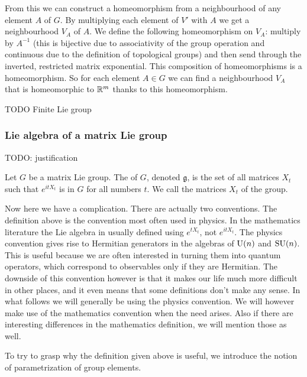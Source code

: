 From this we can construct a homeomorphism from a neighbourhood of any element $A$ of $G$. By multiplying each element of $V'$ with $A$ we get a neighbourhood $V_A$ of $A$. We define the following homeomorphism on $V_A$: multiply by $A^{-1}$ (this is bijective due to associativity of the group operation and continuous due to the definition of topological groups) and then send through the inverted, restricted matrix exponential. This composition of homeomorphisms is a homeomorphism. So for each element $A \in G$ we can find a neighbourhood $V_A$ that is homeomorphic to $\mathbb{R}^m$ thanks to this homeomorphism.

\begin{example}
TODO Finite Lie group
\end{example}


\subsubsection{Lie algebra of a matrix Lie group}
TODO: justification

\begin{definition}
Let $G$ be a matrix Lie group. The  of $G$, denoted $\mathfrak{g}$, is the set of all matrices $X_t$ such that $e^{itX_t}$ is in $G$ for all  numbers $t$. We call the matrices $X_t$  of the group.
\end{definition}

\begin{note}
Now here we have a complication. There are actually two conventions. The definition above is the convention most often used in physics. In the mathematics literature the Lie algebra in usually defined using $e^{tX_t}$, not $e^{itX_t}$. The physics convention gives rise to Hermitian generators in the algebras of $\operatorname{U}(n)$ and $\operatorname{SU}(n)$. This is useful because we are often interested in turning them into quantum operators, which correspond to observables only if they are Hermitian. The downside of this convention however is that it makes our life much more difficult in other places, and it even means that some definitions don't make any sense. In what follows we will generally be using the physics convention. We will however make use of the mathematics convention when the need arises. Also if there are interesting differences in the mathematics definition, we will mention those as well.
\end{note}

To try to grasp why the definition given above is useful, we introduce the notion of parametrization of group elements.

